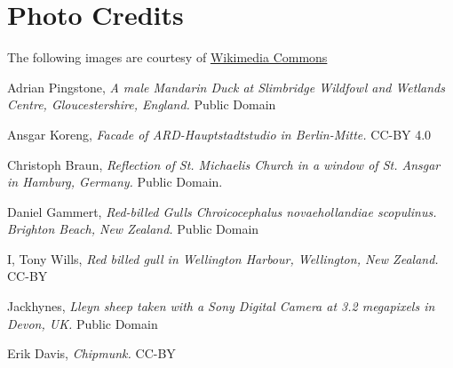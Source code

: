 \documentclass{ximera}
\begin{document}
\begin{problem}
 \begin{center}
\end{center}
 \end{problem}


\section*{Photo Credits}
The following images are courtesy of \href{https://commons.wikimedia.org/wiki/Main_Page}
{Wikimedia Commons}

Adrian Pingstone, {\it A male Mandarin Duck at Slimbridge Wildfowl and Wetlands Centre, Gloucestershire, England.} Public Domain

Ansgar Koreng, {\it Facade of ARD-Hauptstadtstudio in Berlin-Mitte.} CC-BY 4.0

Christoph Braun, {\it Reflection of St. Michaelis Church in a window of St. Ansgar in Hamburg, Germany.} Public Domain.

Daniel Gammert, {\it Red-billed Gulls Chroicocephalus novaehollandiae scopulinus. Brighton Beach, New Zealand.} Public Domain

 I, Tony Wills, {\it Red billed gull in Wellington Harbour, Wellington, New Zealand.}  CC-BY

Jackhynes, {\it Lleyn sheep taken with a Sony Digital Camera at 3.2 megapixels in Devon, UK.} Public Domain

Erik Davis, {\it Chipmunk.} CC-BY
\end{document}
